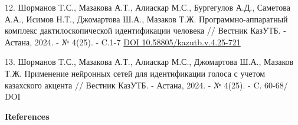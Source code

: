 \begin{references}
12. Шорманов Т.С., Мазакова А.Т., Алиаскар М.С., Бургегулов А.Д.,
Саметова А.А., Исимов Н.Т., Джомартова Ш.А., Мазаков Т.Ж.
Программно-аппаратный комплекс дактилоскопической идентификации человека
// Вестник КазУТБ. - Астана, 2024. - № 4(25). - C.1-7
\href{https://doi.org/10.58805/kazutb.v.4.25-721}{DOI
10.58805/kazutb.v.4.25-721}

13. Шорманов Т.С., Мазакова А.Т., Алиаскар М.С., Джомартова Ш.А., Мазаков
Т.Ж. Применение нейронных сетей для идентификации голоса с учетом
казахского акцента // Вестник КазУТБ. - Астана, 2024. - № 4(25). - C.
60-68/ DOI
\href{https://doi.org/10.58805/kazutb.v.4.25-720}{}
\end{references}

\begin{center}
{\bfseries References}
\end{center}

